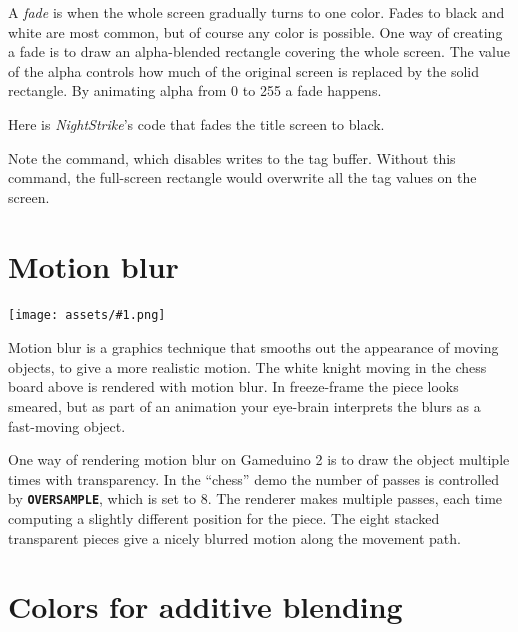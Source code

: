 \documentclass[10pt]{book}
\makeatletter
\newcommand{\gdtwo}{Gameduino 2 }
\newcommand{\png}[1]{
\begin{center}
\texttt{[image: assets/\#1.png]}
\end{center}
}
\newcommand{\mach}[1]{\texttt{\textbf{#1}}}
\newcommand{\cmdidx}[1]{
\index{#1@\mach{#1()}}
}
\newcommand{\dcmd}[1]{\cmdidx{#1}\nameref{#1}}
\newcommand{\term}[1]{\emph{#1}\index{#1}}
\makeatother
\begin{document}
\begin{CJK}{UTF8}{gkai}
A \term{fade} is when the whole screen gradually turns to one color.
Fades to black and white are most common, but of course any color is possible.
One way of creating a fade is to draw an alpha-blended rectangle covering the whole screen.
The value of the alpha controls how much of the original screen is replaced by the solid rectangle.
By animating alpha from 0 to 255 a fade happens.

Here is \textit{NightStrike}'s code that fades the title screen to black.


Note the \dcmd{TagMask} command, which disables writes
to the tag buffer.
Without this command,
the full-screen rectangle would overwrite all the tag values on the screen.

\newpage
\section{Motion blur}
\png{chess}

Motion blur is a graphics technique that smooths out the 
appearance of moving objects, to give a more realistic motion.
The white knight moving in the chess board above is rendered with
motion blur. In freeze-frame the piece looks smeared, but as part of
an animation your eye-brain interprets the blurs as
a fast-moving object.

One way of rendering motion blur on \gdtwo is to draw the object 
multiple times with transparency. In the ``chess'' demo the number of passes
is controlled by \mach{OVERSAMPLE}, which is set to 8.
The renderer makes multiple passes, each time computing a slightly different
position for the piece.  
The eight stacked transparent pieces give a nicely blurred motion along the movement path.


\newpage
\section{Colors for additive blending}


\end{CJK}
\end{document}
